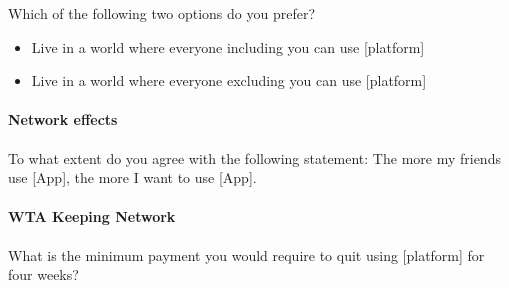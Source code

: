 \documentclass[11pt]{article}
\begin{document}
Which of the following two options do you prefer?
\begin{itemize}
    \item Live in a world where everyone including you can use [platform]
    \item Live in a world where everyone excluding you can use [platform]
\end{itemize}

\paragraph{Network effects}

To what extent do you agree with the following statement: The more my friends use [App], the more I want to use [App].

\paragraph{WTA Keeping Network}

What is the minimum payment you would require to quit using [platform] for four weeks?

%
\clearpage

%
\clearpage

%
\clearpage

%
\clearpage

%
\end{document}
